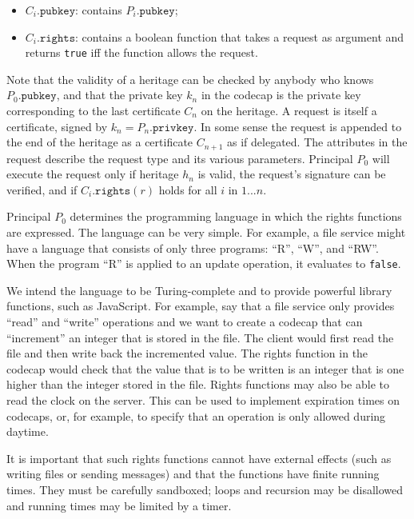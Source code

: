 \documentclass[10pt, conference, compsocconf]{IEEEtran}
\begin{document}
\begin{itemize}
\item $C_i.\texttt{pubkey}$: contains $P_i.\texttt{pubkey}$;
\item $C_i.\texttt{rights}$:
contains a boolean function that
takes a request as argument and returns \texttt{true} iff the
function allows the request.
\end{itemize}

\noindent
Note that the validity of a heritage can be checked by anybody
who knows $P_0.\texttt{pubkey}$, and that the private key $k_n$
in the codecap is the private key corresponding to the last
certificate $C_n$ on the heritage.
A request is itself a certificate, signed by $k_n = P_n.\texttt{privkey}$.
In some sense the request is appended to the end of the heritage as
a certificate $C_{n+1}$ as if delegated.
The attributes in the request describe the request type and its various
parameters.
Principal $P_0$ will execute the request only if
heritage $h_n$ is valid, the request's signature can be verified,
and if $C_i.\texttt{rights}(r)$ holds for all $i$ in $1 ... n$.

Principal $P_0$ determines the programming language in which the
rights functions are expressed.  The language can be very simple.
For example, a file service might have a language that consists of
only three programs: ``R'', ``W'', and ``RW''.
When the program ``R'' is applied to an update operation, it evaluates
to \texttt{false}.

We intend the language to be Turing-complete and to provide
powerful library functions, such as JavaScript.
For example, say that a file service only provides ``read'' and ``write''
operations and we want to create a codecap that can ``increment''
an integer that is stored in the file.  The client would first read
the file and then write back the incremented value.  The rights
function in the codecap would check that the value that is to be
written is an integer that is one higher than the integer stored
in the file.  Rights functions may also be able to read the clock
on the server.  This can be used to implement expiration times on
codecaps, or, for example, to specify that an operation is
only allowed during daytime.

It is important that such rights functions cannot have
external effects (such as writing files or sending messages) and
that the functions have finite running times.  They must be carefully
sandboxed; loops and recursion may be disallowed and running times
may be limited by a timer.
\end{document}
